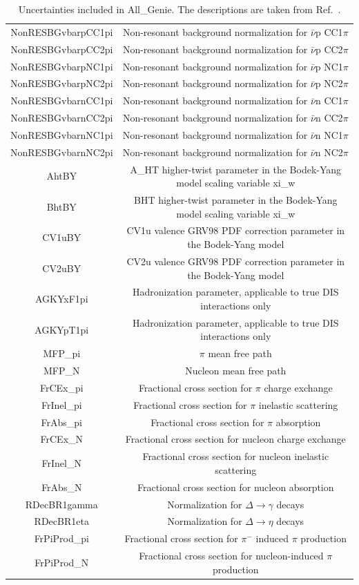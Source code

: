 \documentclass[a4paper]{article}
\begin{document}
\begin{table}[H]
\begin{tabular}{| c | c |}
NonRESBGvbarpCC1pi & Non-resonant background normalization for $\bar\nu$p CC1$\pi$\\
NonRESBGvbarpCC2pi & Non-resonant background normalization for $\bar\nu$p CC2$\pi$\\
NonRESBGvbarpNC1pi & Non-resonant background normalization for $\bar\nu$p NC1$\pi$\\
NonRESBGvbarpNC2pi & Non-resonant background normalization for $\bar\nu$p NC2$\pi$\\
NonRESBGvbarnCC1pi & Non-resonant background normalization for $\bar\nu$n CC1$\pi$\\
NonRESBGvbarnCC2pi & Non-resonant background normalization for $\bar\nu$n CC2$\pi$\\
NonRESBGvbarnNC1pi & Non-resonant background normalization for $\bar\nu$n NC1$\pi$\\
NonRESBGvbarnNC2pi & Non-resonant background normalization for $\bar\nu$n NC2$\pi$\\
AhtBY & A\_HT higher-twist parameter in the Bodek-Yang model scaling variable xi\_w\\
BhtBY & BHT higher-twist parameter in the Bodek-Yang model scaling variable xi\_w\\
CV1uBY & CV1u valence GRV98 PDF correction parameter in the Bodek-Yang model\\
CV2uBY & CV2u valence GRV98 PDF correction parameter in the Bodek-Yang model\\
AGKYxF1pi & Hadronization parameter, applicable to true DIS interactions only\\
AGKYpT1pi & Hadronization parameter, applicable to true DIS interactions only\\
MFP\_pi & $\pi$ mean free path\\
MFP\_N & Nucleon mean free path\\
FrCEx\_pi & Fractional cross section for $\pi$ charge exchange\\
FrInel\_pi & Fractional cross section for $\pi$ inelastic scattering\\
FrAbs\_pi & Fractional cross section for $\pi$ absorption\\
FrCEx\_N & Fractional cross section for nucleon charge exchange\\
FrInel\_N & Fractional cross section for nucleon inelastic scattering\\
FrAbs\_N & Fractional cross section for nucleon absorption\\
RDecBR1gamma & Normalization for $\Delta\to\gamma$ decays\\
RDecBR1eta & Normalization for $\Delta\to\eta$ decays\\
FrPiProd\_pi & Fractional cross section for $\pi^-$ induced $\pi$ production\\
FrPiProd\_N & Fractional cross section for nucleon-induced $\pi$ production\\
\hline
\end{tabular}
\caption{Uncertainties included in All\_Genie. The descriptions are taken from Ref.~\cite{bib:geniesupportnote}.}
\label{tab:AllGenie}
\end{table}
\end{document}
